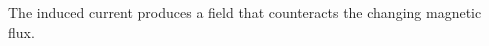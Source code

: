 

\vspace*{\fill}
\centering

The induced current produces a field that counteracts the changing magnetic flux.

\centering
\vspace*{\fill}

